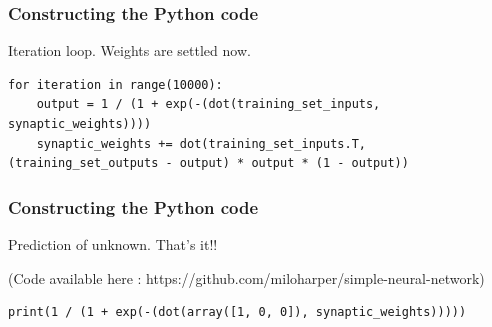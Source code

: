 \begin{frame}[fragile] \frametitle{Constructing the Python code}
Iteration loop. Weights are settled now.
\begin{lstlisting}
for iteration in range(10000):
    output = 1 / (1 + exp(-(dot(training_set_inputs, synaptic_weights))))
    synaptic_weights += dot(training_set_inputs.T, (training_set_outputs - output) * output * (1 - output))
\end{lstlisting}
\end{frame}

\begin{frame}[fragile] \frametitle{Constructing the Python code}
Prediction of unknown. That's it!!

{\tiny (Code available here : https://github.com/miloharper/simple-neural-network)}
\begin{lstlisting}
print(1 / (1 + exp(-(dot(array([1, 0, 0]), synaptic_weights)))))
\end{lstlisting}
\end{frame}